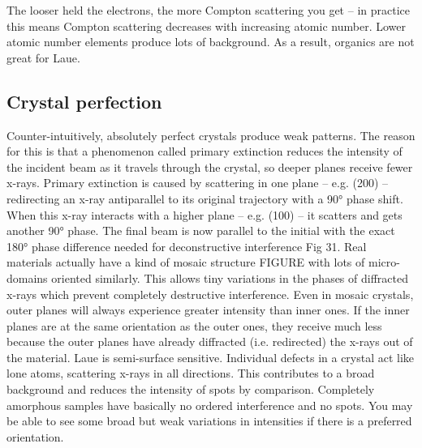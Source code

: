 The looser held the electrons, the more Compton scattering you get – in practice this means Compton scattering decreases with increasing atomic number. Lower atomic number elements produce lots of background. As a result, organics are not great for Laue.
\subsection{Crystal perfection}
Counter-intuitively, absolutely perfect crystals produce weak patterns. The reason for this is that a phenomenon called primary extinction reduces the intensity of the incident beam as it travels through the crystal, so deeper planes receive fewer x-rays. Primary extinction is caused by scattering in one plane – e.g. (200) – redirecting an x-ray antiparallel to its original trajectory with a 90° phase shift. When this x-ray interacts with a higher plane – e.g. (100) – it scatters and gets another 90° phase. The final beam is now parallel to the initial with the exact 180° phase difference needed for deconstructive interference Fig 31.
Real materials actually have a kind of mosaic structure FIGURE with lots of micro-domains oriented similarly. This allows tiny variations in the phases of diffracted x-rays which prevent completely destructive interference.
Even in mosaic crystals, outer planes will always experience greater intensity than inner ones. If the inner planes are at the same orientation as the outer ones, they receive much less because the outer planes have already diffracted (i.e. redirected) the x-rays out of the material. Laue is semi-surface sensitive.
Individual defects in a crystal act like lone atoms, scattering x-rays in all directions. This contributes to a broad background and reduces the intensity of spots by comparison. Completely amorphous samples have basically no ordered interference and no spots. You may be able to see some broad but weak variations in intensities if there is a preferred orientation.

